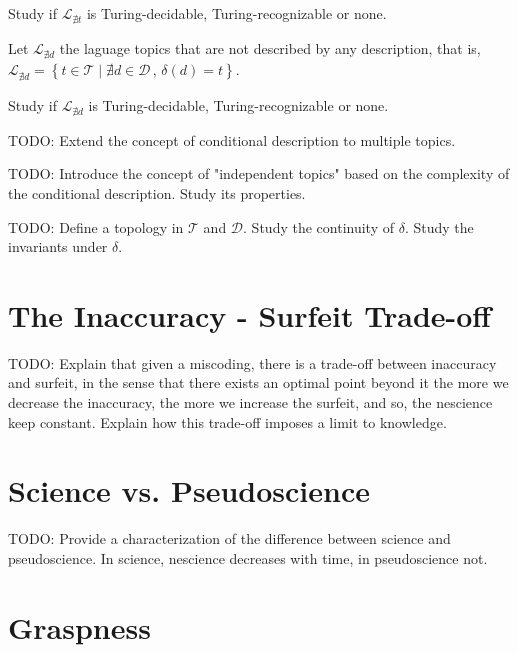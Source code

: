 \begin{proposition}
Study if $\mathcal{L}_{\nexists t}$ is Turing-decidable, Turing-recognizable or none.
\end{proposition}

Let $\mathcal{L}_{\nexists d}$ the laguage topics that are not described by any description, that is, $\mathcal{L}_{\nexists d}=\left\{ t\in\mathcal{T}\mid\nexists d\in\mathcal{D}\,,\,\delta\left(d\right)=t\right\}$.

\begin{proposition}
Study if $\mathcal{L}_{\nexists d}$ is Turing-decidable, Turing-recognizable or none.
\end{proposition}

{\color{red} TODO: Extend the concept of conditional description to multiple topics.}

{\color{red} TODO: Introduce the concept of "independent topics" based on the complexity of the conditional description. Study its properties.}

{\color{red} TODO: Define a topology in $\mathcal{T}$ and $\mathcal{D}$. Study the continuity of $\delta$. Study the invariants under $\delta$.}


%
%

\section{The Inaccuracy - Surfeit Trade-off}

{\color{red} TODO: Explain that given a miscoding, there is a trade-off between inaccuracy and surfeit, in the sense that there exists an optimal point beyond it the more we decrease the inaccuracy, the more we increase the surfeit, and so, the nescience keep constant. Explain how this trade-off imposes a limit to knowledge.}

%
%

\section{Science vs. Pseudoscience}

{\color{red} TODO: Provide a characterization of the difference between science and pseudoscience. In science, nescience decreases with time, in pseudoscience not.}

%
%
\section{Graspness}

